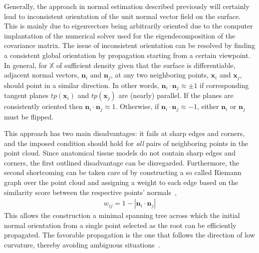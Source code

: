 Generally, the approach in normal estimation described previously will certainly lead to inconsistent orientation of the unit normal vector field on the surface.
This is mainly due to eigenvectors being arbitrarily oriented due to the computer implantation of the numerical solver used for the eigendecomposition of the covariance matrix.
The issue of inconsistent orientation can be resolved by finding a consistent global orientation by propagation starting from a certain viewpoint.
In general, for $\mathbb{X}$ of sufficient density given that the surface is differentiable, adjacent normal vectors, $\mathbf{n}_i$ and $\mathbf{n}_j$, at any two neighboring points, $\mathbf{x}_i$ and $\mathbf{x}_j$, should point in a similar direction.
In other words, $\mathbf{n}_i \cdot \mathbf{n}_j \approx \pm 1$ if corresponding tangent planes $tp(\mathbf{x}_i)$ and $tp(\mathbf{x}_j)$ are (nearly) parallel.
If the planes are consistently oriented then $\mathbf{n}_i \cdot \mathbf{n}_j \approx 1$.
Otherwise, if $\mathbf{n}_i \cdot \mathbf{n}_j \approx -1$, either $\mathbf{n}_i$ or $\mathbf{n}_j$ must be flipped.

This approach has two main disadvantages: it fails at sharp edges and corners, and the imposed condition should hold for \emph{all} pairs of neighboring points in the point cloud.
Since anatomical tissue models do not contain sharp edges and corners, the first outlined disadvantage can be disregarded.
Furthermore, the second shortcoming can be taken care of by constructing a so called Riemann graph over the point cloud and assigning a weight to each edge based on the similarity score between the respective points' normals~\cite{Hoppe1992Surface},
\begin{align}
    w_{ij} = 1 - \left| \mathbf{n}_i \cdot \mathbf{n}_j \right|
\end{align}
This allows the construction a minimal spanning tree across which the initial normal orientation from a single point selected as the root can be efficiently propagated.
The favorable propagation is the one that follows the direction of low curvature, thereby avoiding ambiguous situations~\cite{Berger2017survey}.

